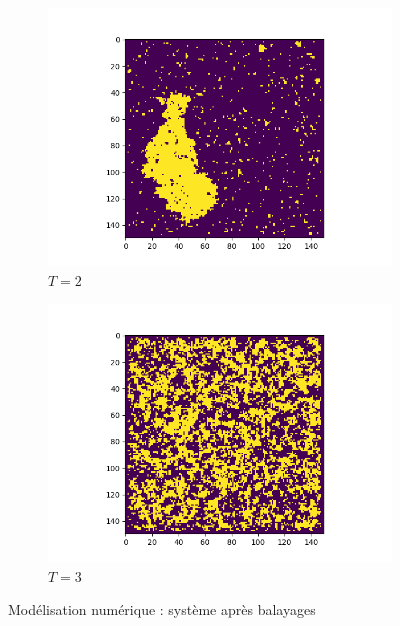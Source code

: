 \documentclass[french]{beamer}
\begin{document}
\begin{frame}
\begin{figure}
	\centering
	\begin{subfigure}{0.5\textwidth}
		\centering
		\includegraphics[height=0.55\textheight]{assets/T2}
		\caption{$T = 2$}
		\label{fig:t2}
	\end{subfigure}%
	\begin{subfigure}{0.5\textwidth}
	\centering
	\includegraphics[height=0.55\textheight]{assets/T3}
	\caption{$T = 3$}
	\label{fig:t3}
\end{subfigure}%
\caption{Modélisation numérique : système après  balayages}
\end{figure}

\end{frame}
\end{document}
